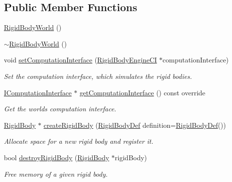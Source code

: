 \subsection*{Public Member Functions}
\begin{DoxyCompactItemize}
\item 
\mbox{\hyperlink{classr3_1_1_rigid_body_world_ae9358def6c2b1ea21d38059242fec505}{Rigid\+Body\+World}} ()
\item 
\mbox{\hyperlink{classr3_1_1_rigid_body_world_add6c229831a203d61ee8f5e2294b4192}{$\sim$\+Rigid\+Body\+World}} ()
\item 
void \mbox{\hyperlink{classr3_1_1_rigid_body_world_a0c5724007917231ebe9bd970d65b0bfe}{set\+Computation\+Interface}} (\mbox{\hyperlink{classr3_1_1_rigid_body_engine_c_i}{Rigid\+Body\+Engine\+CI}} $\ast$computation\+Interface)
\begin{DoxyCompactList}\small\item\em Set the computation interface, which simulates the rigid bodies. \end{DoxyCompactList}\item 
\mbox{\hyperlink{classr3_1_1_i_computation_interface}{I\+Computation\+Interface}} $\ast$ \mbox{\hyperlink{classr3_1_1_rigid_body_world_ac25b39a5b15666d99f42b68f29f8a97b}{get\+Computation\+Interface}} () const override
\begin{DoxyCompactList}\small\item\em Get the world\textquotesingle{}s computation interface. \end{DoxyCompactList}\item 
\mbox{\hyperlink{classr3_1_1_rigid_body}{Rigid\+Body}} $\ast$ \mbox{\hyperlink{classr3_1_1_rigid_body_world_a647ca787c02a56c230eb5d50080b561d}{create\+Rigid\+Body}} (\mbox{\hyperlink{structr3_1_1_rigid_body_def}{Rigid\+Body\+Def}} definition=\mbox{\hyperlink{structr3_1_1_rigid_body_def}{Rigid\+Body\+Def}}())
\begin{DoxyCompactList}\small\item\em Allocate space for a new rigid body and register it. \end{DoxyCompactList}\item 
bool \mbox{\hyperlink{classr3_1_1_rigid_body_world_a1a203fb9675eba999e0f59c23e597111}{destroy\+Rigid\+Body}} (\mbox{\hyperlink{classr3_1_1_rigid_body}{Rigid\+Body}} $\ast$rigid\+Body)
\begin{DoxyCompactList}\small\item\em Free memory of a given rigid body. \end{DoxyCompactList}\item 

\end{DoxyCompactItemize}
